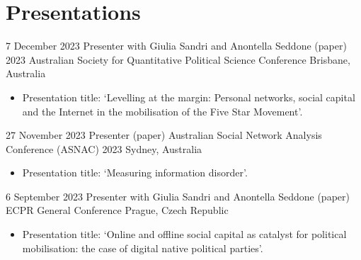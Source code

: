 \documentclass[11pt,a4paper,sans]{moderncv}
\begin{document}











\section{Presentations}

\cventry 
{7 December 2023}
{Presenter with Giulia Sandri and Anontella Seddone (paper)}
{2023 Australian Society for Quantitative Political Science Conference}
{Brisbane, Australia}
{}
      {
      \begin{itemize} %
        \item {Presentation title: `Levelling at the margin: Personal networks, social capital and the Internet in the mobilisation of the Five Star Movement'.}
      \end{itemize}
    }


\cventry 
{27 November 2023}
{Presenter (paper)}
{Australian Social Network Analysis Conference (ASNAC) 2023}
{Sydney, Australia}
{}
      {
      \begin{itemize} %
        \item {Presentation title: `Measuring information disorder'.}
      \end{itemize}
    }

\cventry 
{6 September 2023}
{Presenter with Giulia Sandri and Anontella Seddone (paper)}
{ECPR General Conference}
{Prague, Czech Republic}
{}
      {
      \begin{itemize} %
        \item {Presentation title: `Online and offline social capital as catalyst for political mobilisation: the case of digital native political parties'.}
      \end{itemize}
    }
\end{document}
